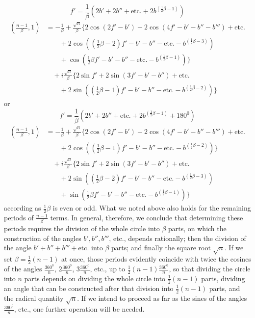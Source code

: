 \begingroup{}
\[
f'=\frac1\beta(2b'+2b''+\text{etc.}+2b^{(\frac12\beta-1)})
\]
\endgroup
\[
\begin{aligned}
\left(\frac{n-1}\beta,1\right)&=-\frac1\beta+\frac{\surd n}\beta\{2\cos(2f'-b')+2\cos(4f'-b'-b''-b''')+\text{etc.}\\
&\qquad+2\cos((\tfrac12\beta-2)f'-b'-b''-\text{etc.}-b^{(\frac12\beta-3)})\\
&\qquad+\cos(\tfrac12\beta f'-b'-b''-\text{etc.}-b^{(\frac12\beta-1)})\}\\
&\quad+i\frac{\surd n}\beta\{2\sin f'+2\sin(3f'-b'-b'')+\text{etc.}\\
&\qquad+2\sin((\tfrac12\beta-1)f'-b'-b''-\text{etc.}-b^{(\frac12\beta-2)})\}
\end{aligned}
\]
or
\[
f'=\frac1\beta(2b'+2b''+\text{etc.}+2b^{(\frac12\beta-1)}+180^0)
\]
\[
\begin{aligned}
\left(\frac{n-1}\beta,1\right)&=-\frac1\beta+\frac{\surd n}\beta\{2\cos(2f'-b')+2\cos(4f'-b'-b''-b''')+\text{etc.}\\
&\qquad+2\cos((\tfrac12\beta-1)f'-b'-b''-\text{etc.}-b^{(\frac12\beta-2)})\}\\
&\quad+i\frac{\surd n}\beta\{2\sin f'+2\sin(3f'-b'-b'')+\text{etc.}\\
&\qquad+2\sin((\tfrac12\beta-2)f'-b'-b''-\text{etc.}-b^{(\frac12\beta-3)})\\
&\qquad+\sin(\tfrac12\beta f'-b'-b''-\text{etc.}-b^{(\frac12\beta-1)})\}
\end{aligned}
\]
according as $\frac12\beta$ is even or odd. What we noted above also holds for the remaining periods of $\frac{n-1}\beta$ terms. In general, therefore, we conclude that determining these periods requires the division of the whole circle into $\beta$ parts, on which the
construction of the angles $b',b'',b'''$, etc., depends rationally; then the division of the angle $b'+b''+b'''+\text{etc.}$ into $\beta$ parts; and finally the square root $\surd n$. If we set $\beta=\frac12(n-1)$ at once, those periods evidently coincide with twice the cosines of the angles $\frac{360^0}n$, $2\frac{360^0}n$, $3\frac{360^0}n$, etc., up to $\frac12(n-1)\frac{360^0}n$, so that dividing the circle into $n$ parts depends on dividing the whole circle into $\frac12(n-1)$ parts, dividing an angle that can be constructed after that division into $\frac12(n-1)$ parts, and the radical quantity $\surd n$. If we intend to proceed as far as the sines of the angles $\frac{360^0}n$, etc., one further operation will be needed.
